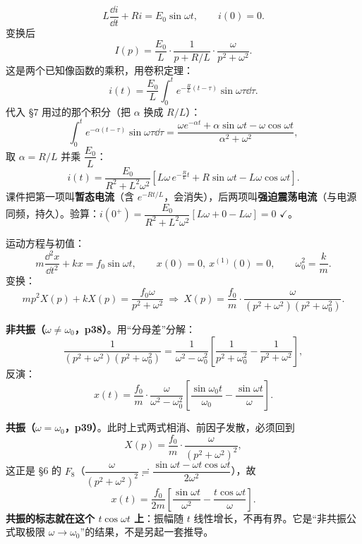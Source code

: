 \documentclass[11pt]{ctexart}
\begin{document}
\[ L\frac{\dd i}{\dd t}+Ri=E_0\sin\omega t,\qquad i(0)=0 .\]
变换后
\[ I(p)=\frac{E_0}{L}\cdot\frac{1}{p+R/L}\cdot\frac{\omega}{p^{2}+\omega^{2}} .\]
这是两个已知像函数的乘积，用卷积定理：
\[ i(t)=\frac{E_0}{L}\int_0^{t}e^{-\frac{R}{L}(t-\tau)}\sin\omega\tau\dd\tau .\]
代入 §7 用过的那个积分（把 $\alpha$ 换成 $R/L$）：
\[ \int_0^{t}e^{-\alpha(t-\tau)}\sin\omega\tau\dd\tau=\frac{\omega e^{-\alpha t}+\alpha\sin\omega t-\omega\cos\omega t}{\alpha^{2}+\omega^{2}} ,\]
取 $\alpha=R/L$ 并乘 $\dfrac{E_0}{L}$：
\[
i(t)=\frac{E_0}{R^{2}+L^{2}\omega^{2}}\left[L\omega\,e^{-\frac{R}{L}t}+R\sin\omega t-L\omega\cos\omega t\right] .
\]
课件把第一项叫\textbf{暂态电流}（含 $e^{-Rt/L}$，会消失），后两项叫\textbf{强迫震荡电流}（与电源同频，持久）。验算：$i(0^{+})=\dfrac{E_0}{R^{2}+L^{2}\omega^{2}}\left[L\omega+0-L\omega\right]=0$ $\checkmark$。


运动方程与初值：
\[ m\frac{\dd^{2}x}{\dd t^{2}}+kx=f_0\sin\omega t,\qquad x(0)=0,\ x^{(1)}(0)=0,\qquad \omega_0^{2}=\frac{k}{m} .\]
变换：
\[ mp^{2}X(p)+kX(p)=\frac{f_0\omega}{p^{2}+\omega^{2}}
\ \Longrightarrow\
X(p)=\frac{f_0}{m}\cdot\frac{\omega}{(p^{2}+\omega^{2})(p^{2}+\omega_0^{2})} .\]

\textbf{非共振（$\omega\ne\omega_0$，p38）}。用“分母差”分解：
\[
\frac{1}{(p^{2}+\omega^{2})(p^{2}+\omega_0^{2})}
=\frac{1}{\omega^{2}-\omega_0^{2}}\left[\frac{1}{p^{2}+\omega_0^{2}}-\frac{1}{p^{2}+\omega^{2}}\right],
\]
反演：
\[
x(t)=\frac{f_0}{m}\cdot\frac{\omega}{\omega^{2}-\omega_0^{2}}
\left[\frac{\sin\omega_0 t}{\omega_0}-\frac{\sin\omega t}{\omega}\right] .
\]

\textbf{共振（$\omega=\omega_0$，p39）}。此时上式两式相消、前因子发散，必须回到
\[ X(p)=\frac{f_0}{m}\cdot\frac{\omega}{(p^{2}+\omega^{2})^{2}} ,\]
这正是 §6 的 $F_8$（$\dfrac{\omega}{(p^{2}+\omega^{2})^{2}}\risingdotseq\dfrac{\sin\omega t-\omega t\cos\omega t}{2\omega^{2}}$），故
\[
x(t)=\frac{f_0}{2m}\left[\frac{\sin\omega t}{\omega^{2}}-\frac{t\cos\omega t}{\omega}\right] .
\]
\textbf{共振的标志就在这个 $t\cos\omega t$ 上}：振幅随 $t$ 线性增长，不再有界。它是“非共振公式取极限 $\omega\to\omega_0$”的结果，不是另起一套推导。

\end{document}
